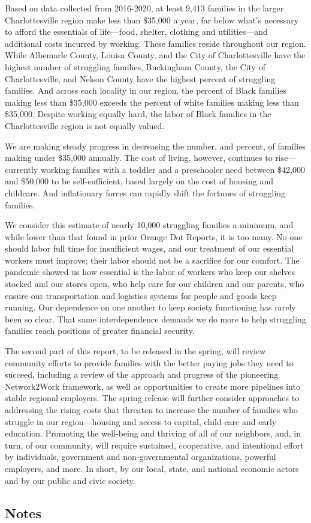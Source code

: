 \documentclass[
]{article}
\begin{document}
Based on data collected from 2016-2020, at least 9,413 families in the
larger Charlottesville region make less than \$35,000 a year, far below
what's necessary to afford the essentials of life---food, shelter,
clothing and utilities---and additional costs incurred by working. These
families reside throughout our region. While Albemarle County, Louisa
County, and the City of Charlottesville have the highest number of
struggling families, Buckingham County, the City of Charlottesville, and
Nelson County have the highest percent of struggling families. And
across each locality in our region, the percent of Black families making
less than \$35,000 exceeds the percent of white families making less
than \$35,000. Despite working equally hard, the labor of Black families
in the Charlottesville region is not equally valued.

We are making steady progress in decreasing the number, and percent, of
families making under \$35,000 annually. The cost of living, however,
continues to rise---currently working families with a toddler and a
preschooler need between \$42,000 and \$50,000 to be self-sufficient,
based largely on the cost of housing and childcare. And inflationary
forces can rapidly shift the fortunes of struggling families.

We consider this estimate of nearly 10,000 struggling families a
minimum, and while lower than that found in prior Orange Dot Reports, it
is too many. No one should labor full time for insufficient wages, and
our treatment of our essential workers must improve; their labor should
not be a sacrifice for our comfort. The pandemic showed us how essential
is the labor of workers who keep our shelves stocked and our stores
open, who help care for our children and our parents, who ensure our
transportation and logistics systems for people and goods keep running.
Our dependence on one another to keep society functioning has rarely
been so clear. That same interdependence demands we do more to help
struggling families reach positions of greater financial security.

The second part of this report, to be released in the spring, will
review community efforts to provide families with the better paying jobs
they need to succeed, including a review of the approach and progress of
the pioneering Network2Work framework, as well as opportunities to
create more pipelines into stable regional employers. The spring release
will further consider approaches to addressing the rising costs that
threaten to increase the number of families who struggle in our
region---housing and access to capital, child care and early education.
Promoting the well-being and thriving of all of our neighbors, and, in
turn, of our community, will require sustained, cooperative, and
intentional effort by individuals, government and non-governmental
organizations, powerful employers, and more. In short, by our local,
state, and national economic actors and by our public and civic society.

\hypertarget{notes}{%
\subsection{Notes}\label{notes}}
\end{document}
